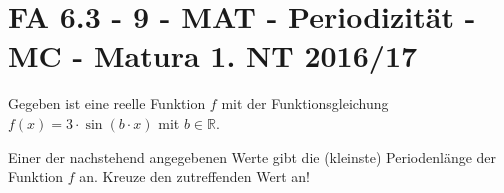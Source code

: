 \section{FA 6.3 - 9 - MAT - Periodizität - MC - Matura 1. NT 2016/17}

\begin{beispiel}[FA 6.3]{1} %
Gegeben ist eine reelle Funktion $f$ mit der Funktionsgleichung $f(x)=3\cdot\sin(b\cdot x)$ mit $b\in\mathbb{R}$.

Einer der nachstehend angegebenen Werte gibt die (kleinste) Periodenlänge der Funktion $f$ an. Kreuze den zutreffenden Wert an!

\end{beispiel}